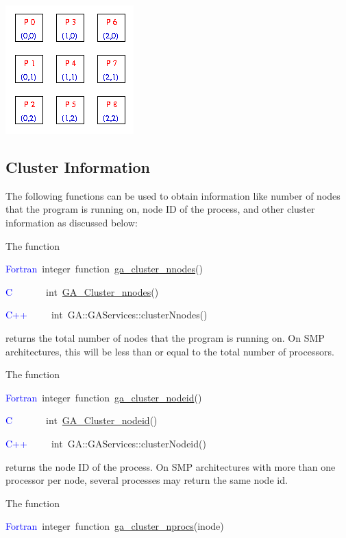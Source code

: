 \includegraphics{topo}


\subsection{Cluster Information }

The following functions can be used to obtain information like number
of nodes that the program is running on, node ID of the process, and
other cluster information as discussed below:

The function

\textcolor{blue}{Fortran}~integer~function~\href{https://hpc.pnl.gov/globalarrays/api/f_op_api.html\#ga_cluster_nnodes}{ga\_{}cluster\_{}nnodes}()~

\textcolor{blue}{C}~~~~~~~int~\href{https://hpc.pnl.gov/globalarrays/api/c_op_api.html\#ga_cluster_nnodes}{GA\_{}Cluster\_{}nnodes}()~

\textcolor{blue}{C++}~~~~~int~GA::GAServices::clusterNnodes()

returns the total number of nodes that the program is running on.
On SMP architectures, this will be less than or equal to the total
number of processors.

The function

\textcolor{blue}{Fortran}~integer~function~\href{https://hpc.pnl.gov/globalarrays/api/f_op_api.html\#ga_cluster_nodeid}{ga\_{}cluster\_{}nodeid}()~

\textcolor{blue}{C}~~~~~~~int~\href{https://hpc.pnl.gov/globalarrays/api/c_op_api.html\#ga_cluster_nodeid}{GA\_{}Cluster\_{}nodeid}()~

\textcolor{blue}{C++}~~~~~int~GA::GAServices::clusterNodeid()

returns the node ID of the process. On SMP architectures with more
than one processor per node, several processes may return the same
node id.

The function

\textcolor{blue}{Fortran}~integer~function~\href{https://hpc.pnl.gov/globalarrays/api/f_op_api.html\#ga_cluster_nprocs}{ga\_{}cluster\_{}nprocs}(inode)

